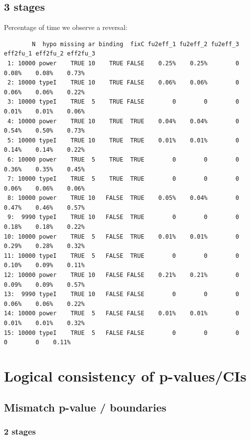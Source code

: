 \documentclass[12pt]{article}
\begin{document}
\subsection{3 stages}
\label{sec:org19f7f06}
Percentage of time we observe a reversal:
\begin{verbatim}
        N  hypo missing ar binding  fixC fu2eff_1 fu2eff_2 fu2eff_3 eff2fu_1 eff2fu_2 eff2fu_3
 1: 10000 power    TRUE 10    TRUE FALSE    0.25%    0.25%        0    0.08%    0.08%    0.73%
 2: 10000 typeI    TRUE 10    TRUE FALSE    0.06%    0.06%        0    0.06%    0.06%    0.22%
 3: 10000 typeI    TRUE  5    TRUE FALSE        0        0        0    0.01%    0.01%    0.06%
 4: 10000 power    TRUE 10    TRUE  TRUE    0.04%    0.04%        0    0.54%    0.50%    0.73%
 5: 10000 typeI    TRUE 10    TRUE  TRUE    0.01%    0.01%        0    0.14%    0.14%    0.22%
 6: 10000 power    TRUE  5    TRUE  TRUE        0        0        0    0.36%    0.35%    0.45%
 7: 10000 typeI    TRUE  5    TRUE  TRUE        0        0        0    0.06%    0.06%    0.06%
 8: 10000 power    TRUE 10   FALSE  TRUE    0.05%    0.04%        0    0.47%    0.46%    0.57%
 9:  9990 typeI    TRUE 10   FALSE  TRUE        0        0        0    0.18%    0.18%    0.22%
10: 10000 power    TRUE  5   FALSE  TRUE    0.01%    0.01%        0    0.29%    0.28%    0.32%
11: 10000 typeI    TRUE  5   FALSE  TRUE        0        0        0    0.10%    0.09%    0.11%
12: 10000 power    TRUE 10   FALSE FALSE    0.21%    0.21%        0    0.09%    0.09%    0.57%
13:  9990 typeI    TRUE 10   FALSE FALSE        0        0        0    0.06%    0.06%    0.22%
14: 10000 power    TRUE  5   FALSE FALSE    0.01%    0.01%        0    0.01%    0.01%    0.32%
15: 10000 typeI    TRUE  5   FALSE FALSE        0        0        0        0        0    0.11%
\end{verbatim}


\clearpage

\section{Logical consistency of p-values/CIs}
\label{sec:org1d54d68}

\subsection{Mismatch p-value / boundaries}
\label{sec:orgbcc1256}
\subsubsection{2 stages}
\label{sec:orgf5154bc}
\end{document}
